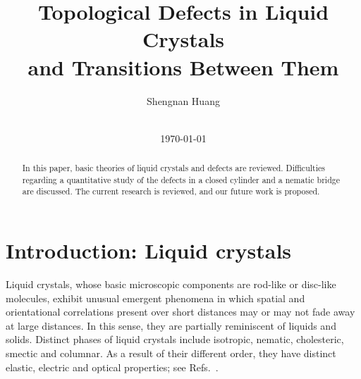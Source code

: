 \documentclass[nottitlepage]{article}
\begin{document}

\title{Topological Defects in Liquid Crystals
\\and Transitions Between Them}

\author{Shengnan Huang\\
\\
}

\date{\today}
\maketitle

\begin{abstract}
In this paper, basic theories of liquid crystals and defects are reviewed. Difficulties regarding a quantitative study of the defects in a closed cylinder and a nematic bridge are discussed. The current research is reviewed, and our future work is proposed.
\end{abstract}






\section {Introduction: Liquid crystals}

Liquid crystals, whose basic microscopic components are rod-like or disc-like molecules, exhibit unusual emergent phenomena in which spatial and orientational correlations present over short distances may or may not fade away at large distances. In this sense, they are partially reminiscent of liquids and solids. Distinct phases of liquid crystals include isotropic, nematic, cholesteric, smectic and columnar. As a result of their different order, they have distinct elastic, electric and optical properties; see Refs.~\cite{Mottram, de gennes}. %

\end{document}
